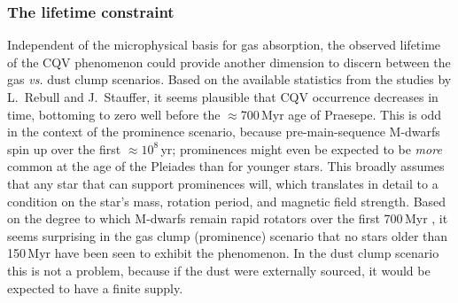 \documentclass[11pt,twocolumn,tighten]{aastex63}
\begin{document}

\subsubsection{The lifetime constraint}
Independent of the microphysical basis for gas absorption, the observed
lifetime of the CQV phenomenon could provide another dimension to discern between
the gas {\it vs.} dust clump scenarios.
Based on the available statistics from the studies by L.~Rebull and J.~Stauffer,
it seems plausible that CQV occurrence decreases in time, bottoming to zero
well before the $\approx$700\,Myr age of Praesepe.
This is odd in the context of the prominence scenario, because pre-main-sequence
M-dwarfs spin up over the first $\approx$$10^8$\,yr;
prominences might even be expected to be {\it more} common at the 
age of the Pleiades than for younger stars.
This broadly assumes that any star that can support prominences will,
which translates in detail to a condition on the star's mass, rotation
period, and magnetic field strength.
Based on the degree to which M-dwarfs remain rapid rotators over the first 700\,Myr
\citep[e.g. Figure~13 of][]{2022AJ....164...80R}, 
it seems surprising in the gas clump (prominence) scenario that no stars
older than 150\,Myr have been seen to exhibit the phenomenon.
In the dust clump scenario this is not a problem, because if the dust
were externally sourced, it would be expected to have a finite supply.
\end{document}
